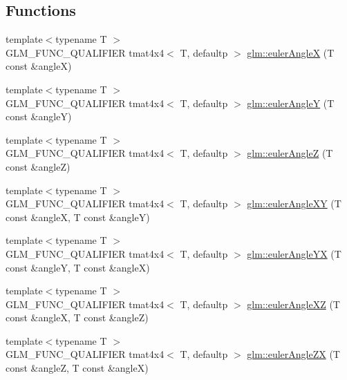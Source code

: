 \subsection*{Functions}
\begin{DoxyCompactItemize}
\item 
{\footnotesize template$<$typename T $>$ }\\G\+L\+M\+\_\+\+F\+U\+N\+C\+\_\+\+Q\+U\+A\+L\+I\+F\+I\+E\+R tmat4x4$<$ T, defaultp $>$ \hyperlink{group__gtx__euler__angles_ga82cd3b8a04943f1a0d1a562aff358dc8}{glm\+::euler\+Angle\+X} (T const \&angle\+X)
\item 
{\footnotesize template$<$typename T $>$ }\\G\+L\+M\+\_\+\+F\+U\+N\+C\+\_\+\+Q\+U\+A\+L\+I\+F\+I\+E\+R tmat4x4$<$ T, defaultp $>$ \hyperlink{group__gtx__euler__angles_gaeb193af1184bdf39c23636d756e1ff33}{glm\+::euler\+Angle\+Y} (T const \&angle\+Y)
\item 
{\footnotesize template$<$typename T $>$ }\\G\+L\+M\+\_\+\+F\+U\+N\+C\+\_\+\+Q\+U\+A\+L\+I\+F\+I\+E\+R tmat4x4$<$ T, defaultp $>$ \hyperlink{group__gtx__euler__angles_gab59c4fe7f735568255cc19fddd3ddfcd}{glm\+::euler\+Angle\+Z} (T const \&angle\+Z)
\item 
{\footnotesize template$<$typename T $>$ }\\G\+L\+M\+\_\+\+F\+U\+N\+C\+\_\+\+Q\+U\+A\+L\+I\+F\+I\+E\+R tmat4x4$<$ T, defaultp $>$ \hyperlink{group__gtx__euler__angles_ga8bf84f92ca976a7f50dbe4b30ceb72dd}{glm\+::euler\+Angle\+X\+Y} (T const \&angle\+X, T const \&angle\+Y)
\item 
{\footnotesize template$<$typename T $>$ }\\G\+L\+M\+\_\+\+F\+U\+N\+C\+\_\+\+Q\+U\+A\+L\+I\+F\+I\+E\+R tmat4x4$<$ T, defaultp $>$ \hyperlink{group__gtx__euler__angles_gafdd02f9a37511190962119adef5c1c25}{glm\+::euler\+Angle\+Y\+X} (T const \&angle\+Y, T const \&angle\+X)
\item 
{\footnotesize template$<$typename T $>$ }\\G\+L\+M\+\_\+\+F\+U\+N\+C\+\_\+\+Q\+U\+A\+L\+I\+F\+I\+E\+R tmat4x4$<$ T, defaultp $>$ \hyperlink{group__gtx__euler__angles_gab2d7dc94b9a7519d741aaa208c7a335b}{glm\+::euler\+Angle\+X\+Z} (T const \&angle\+X, T const \&angle\+Z)
\item 
{\footnotesize template$<$typename T $>$ }\\G\+L\+M\+\_\+\+F\+U\+N\+C\+\_\+\+Q\+U\+A\+L\+I\+F\+I\+E\+R tmat4x4$<$ T, defaultp $>$ \hyperlink{group__gtx__euler__angles_gaef83cf40bd9ae780011b29970f16f622}{glm\+::euler\+Angle\+Z\+X} (T const \&angle\+Z, T const \&angle\+X)

\end{DoxyCompactItemize}
